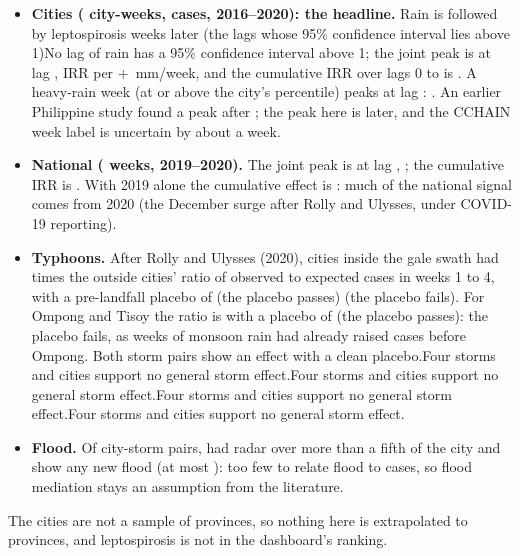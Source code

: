 \begin{itemize}
\item \textbf{Cities (\cityObs{} city-weeks, \cityCases{} cases, 2016--2020): the headline.} \ifCitySig Rain is followed by leptospirosis \citySigRange{} weeks later (the lags whose 95\% confidence interval lies above 1)\else No lag of rain has a 95\% confidence interval above 1\fi; the joint peak is at lag \cityPeakLag{}, IRR \cityPeakCI{} per +\leptoRainPer{}~mm/week, and the cumulative IRR over lags 0 to \leptoMaxLag{} is \cityCumCI{}. A heavy-rain week (at or above the city's \leptoHeavyPctl{} percentile) peaks at lag \heavyPeakLag{}: \heavyPeakCI{}. An earlier Philippine study found a peak after \litLeptoPeak{} \parencite{matsushita2018}\ifCityPeakLater; the peak here is later, and the CCHAIN week label is uncertain by about a week\fi.
\item \textbf{National (\natObs{} weeks, 2019--2020).} The joint peak is at lag \natPeakLag{}, \natPeakCI{}; the cumulative IRR is \natCumCI{}. With 2019 alone the cumulative effect is \natNineteenCumCI{}\ifNatNineteenNull: much of the national signal comes from 2020 (the December surge after Rolly and Ulysses, under COVID-19 reporting)\fi.
\item \textbf{Typhoons.} After Rolly and Ulysses (2020), cities inside the gale swath had \didRUPost{} times the outside cities' ratio of observed to expected cases in weeks 1 to 4, with a pre-landfall placebo of \didRUPre{}\ifRUPlaceboOK{} (the placebo passes)\else{} (the placebo fails)\fi. For Ompong and Tisoy the ratio is \didOTPost{} with a placebo of \didOTPre{}\ifOTPlaceboOK{} (the placebo passes)\else{}: the placebo fails, as weeks of monsoon rain had already raised cases before Ompong\fi. \ifRUPostSig\ifOTPostSig\ifRUPlaceboOK\ifOTPlaceboOK Both storm pairs show an effect with a clean placebo.\else Four storms and \leptoNCities{} cities support no general storm effect.\fi\else Four storms and \leptoNCities{} cities support no general storm effect.\fi\else Four storms and \leptoNCities{} cities support no general storm effect.\fi\else Four storms and \leptoNCities{} cities support no general storm effect.\fi
\item \textbf{Flood.} Of \sOnePairs{} city-storm pairs, \sOnePairsSeen{} had radar over more than a fifth of the city and \sOnePairsFlooded{} show any new flood (at most \sOnePairsMax{})\ifLeptoFloodFew: too few to relate flood to cases, so flood mediation stays an assumption from the literature\fi.
\end{itemize}

The \leptoNCities{} cities are not a sample of provinces, so nothing here is extrapolated to provinces, and leptospirosis is not in the dashboard's ranking.
